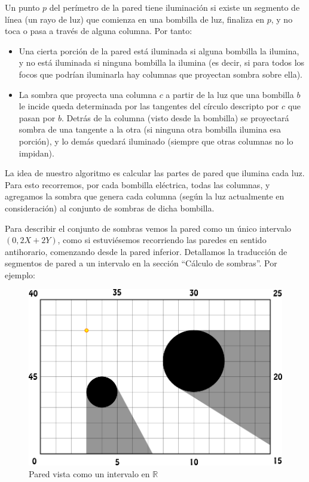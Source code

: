 Un punto $p$ del perímetro de la pared tiene iluminación si
existe un segmento de línea (un rayo de luz) que comienza en una bombilla de luz, finaliza
en $p$, y no toca o pasa a través de alguna columna. Por tanto:

\begin{itemize}
\item Una cierta porción de la pared está iluminada si alguna bombilla la ilumina, y
no está iluminada si ninguna bombilla la ilumina (es decir, si para todos los focos
que podrían iluminarla hay columnas que proyectan sombra sobre ella).

\item La sombra que proyecta una columna $c$ a partir de la luz que una bombilla $b$ le incide
queda determinada por las tangentes del círculo descripto por $c$ que pasan por $b$.
Detrás de la columna (visto desde la bombilla) se proyectará sombra de una
tangente a la otra (si ninguna otra bombilla ilumina esa porción), y
lo demás quedará iluminado (siempre que otras columnas no lo impidan).
\end{itemize}

La idea de nuestro algoritmo es calcular las partes de pared que ilumina
cada luz. Para esto recorremos, por cada bombilla eléctrica, todas las
columnas, y agregamos la sombra que genera cada columna (según la luz
actualmente en consideración) al conjunto de sombras de dicha bombilla.

Para describir el conjunto de sombras vemos la pared como un único intervalo
$(0, 2X + 2Y)$, como si estuviésemos recorriendo las paredes en sentido
antihorario, comenzando desde la pared inferior. Detallamos la traducción de
segmentos de pared a un intervalo en la sección ``Cálculo de sombras''. Por
ejemplo:

\begin{figure}[H]
\centering
\label{bl_2}
\caption{\sc Pared vista como un intervalo en $\mathbb R$}
\includegraphics[scale=1.0]{./figuras/bl_2.png}
\end{figure}

